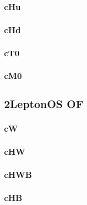 \documentclass[landscape, 12pt,letterpaper]{article}
\begin{document}
\subsubsection{cHu}


\newpage

\subsubsection{cHd}


\newpage

\subsubsection{cT0}


\newpage

\subsubsection{cM0}


\newpage

\newpage

\subsection{2LeptonOS OF}
\subsubsection{cW}


\newpage

\subsubsection{cHW}


\newpage

\subsubsection{cHWB}


\newpage

\subsubsection{cHB}

\end{document}
